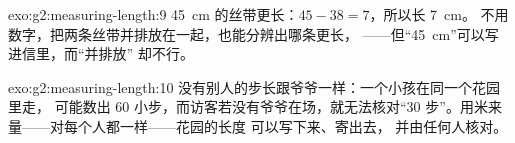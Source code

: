 \begin{solution}{exo:g2:measuring-length:9}
\qty{45}{cm} 的丝带更长：$45 - 38 = 7$，所以长 \qty{7}{cm}。
不用数字，把两条丝带并排放在一起，也能分辨出哪条更长，
——但“\qty{45}{cm}”可以写进信里，而“并排放”
却不行。
\end{solution}

\begin{solution}{exo:g2:measuring-length:10}
没有别人的步长跟爷爷一样：一个小孩在同一个花园里走，
可能数出 $60$ 小步，而访客若没有爷爷在场，就无法核对“$30$
步”。用米来量——对每个人都一样——花园的长度
可以写下来、寄出去，
并由任何人核对。
\end{solution}
